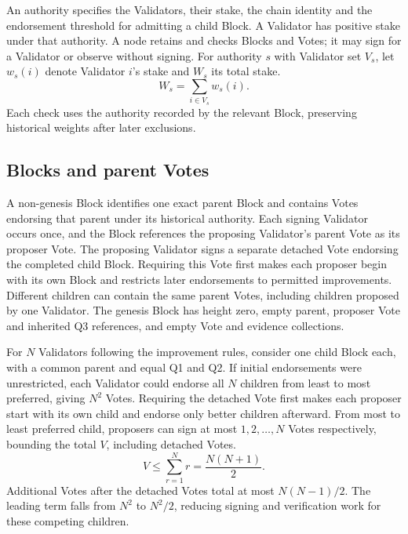 An authority specifies the Validators, their stake, the chain identity and the endorsement threshold for admitting a child Block.
A Validator has positive stake under that authority.
A node retains and checks Blocks and Votes; it may sign for a Validator or observe without signing.
For authority $s$ with Validator set $V_s$, let $w_s(i)$ denote Validator $i$'s stake and $W_s$ its total stake.
\[
W_s=\sum_{i\in V_s}w_s(i).
\]
Each check uses the authority recorded by the relevant Block, preserving historical weights after later exclusions.

\subsection{Blocks and parent Votes}\label{sec:proposals}

A non-genesis Block identifies one exact parent Block and contains Votes endorsing that parent under its historical authority.
Each signing Validator occurs once, and the Block references the proposing Validator's parent Vote as its proposer Vote.
The proposing Validator signs a separate detached Vote endorsing the completed child Block.
Requiring this Vote first makes each proposer begin with its own Block and restricts later endorsements to permitted improvements.
Different children can contain the same parent Votes, including children proposed by one Validator.
The genesis Block has height zero, empty parent, proposer Vote and inherited Q3 references, and empty Vote and evidence collections.

For $N$ Validators following the improvement rules, consider one child Block each, with a common parent and equal Q1 and Q2.
If initial endorsements were unrestricted, each Validator could endorse all $N$ children from least to most preferred, giving $N^2$ Votes.
Requiring the detached Vote first makes each proposer start with its own child and endorse only better children afterward.
From most to least preferred child, proposers can sign at most $1,2,\ldots,N$ Votes respectively, bounding the total $V$, including detached Votes.
\[
V\leq\sum_{r=1}^{N}r=\frac{N(N+1)}{2}.
\]
Additional Votes after the detached Votes total at most $N(N-1)/2$.
The leading term falls from $N^2$ to $N^2/2$, reducing signing and verification work for these competing children.

